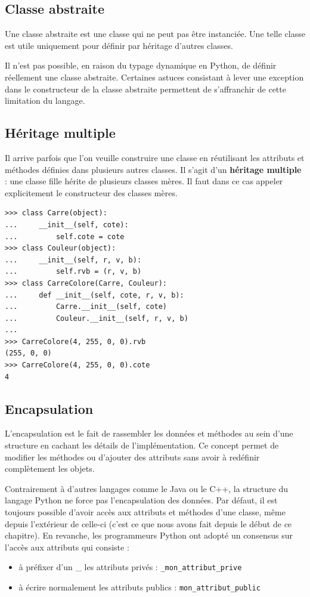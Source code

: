 \documentclass[12pt, a4paper]{article}
\begin{document}
\subsection{Classe abstraite}
Une classe abstraite est une classe qui ne peut pas être instanciée. Une telle classe est utile uniquement pour définir par héritage d'autres classes.

Il n'est pas possible, en raison du typage dynamique en Python, de définir réellement une classe abstraite. Certaines astuces consistant à lever une exception dans le constructeur de la classe abstraite permettent de s'affranchir de cette limitation du langage. 



\subsection{Héritage multiple}
Il arrive parfois que l'on veuille construire une classe en réutilisant les attributs et méthodes définies dans plusieurs autres classes. Il s'agit d'un \textbf{héritage multiple} : une classe fille hérite de plusieurs classes mères. Il faut dans ce cas appeler explicitement le constructeur des classes mères.
\begin{lstlisting}
>>> class Carre(object):
...     __init__(self, cote):
...         self.cote = cote
>>> class Couleur(object): 
...     __init__(self, r, v, b):
...         self.rvb = (r, v, b)
>>> class CarreColore(Carre, Couleur):
...     def __init__(self, cote, r, v, b):
...         Carre.__init__(self, cote)
...         Couleur.__init__(self, r, v, b)
...
>>> CarreColore(4, 255, 0, 0).rvb
(255, 0, 0)
>>> CarreColore(4, 255, 0, 0).cote
4
\end{lstlisting}


\subsection{Encapsulation}
L'encapsulation est le fait de rassembler les données et méthodes au sein d'une structure en cachant les détails de l'implémentation. Ce concept permet de modifier les méthodes ou d'ajouter des attributs sans avoir à redéfinir complètement les objets.

Contrairement à d'autres langages comme le Java ou le C++, la structure du langage Python ne force pas l'encapsulation des données. Par défaut, il est toujours possible d'avoir accès aux attributs et méthodes d'une classe, même depuis l'extérieur de celle-ci (c'est ce que nous avons fait depuis le début de ce chapitre). En revanche, les programmeurs Python ont adopté un consensus sur l'accès aux attributs qui consiste :
\begin{itemize}
	\item à préfixer d'un \_ les attributs privés : \lstinline{_mon_attribut_prive}
	\item à écrire normalement les attributs publics : \lstinline{mon_attribut_public}
\end{itemize}
\end{document}
